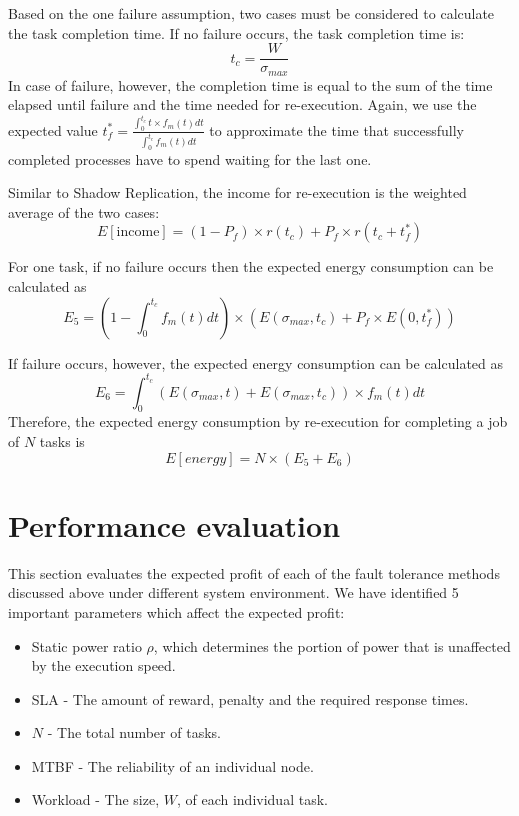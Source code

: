 Based on the one failure assumption, two cases must be considered to
calculate the task completion time. If no failure occurs, the task
completion time is:
\begin{equation}
t_c=\frac{W}{\sigma_{max}}
\end{equation}
In case of failure, however, the completion time is equal to the sum
of the time elapsed until failure and the time needed for
re-execution. Again, we use the expected value
$t_f^*=\frac{\int_0^{t_c}t \times f_m(t)dt}{\int_0^{t_c}f_m(t)dt}$ to
approximate the time that successfully completed processes have to
spend waiting for the last one.

Similar to Shadow Replication, the income for re-execution is the
weighted average of the two cases:
\begin{equation}
E[\text{income}]=(1-P_f) \times r(t_c) + P_f \times r(t_c+t_f^{*})
\end{equation}

For one task, if no failure occurs then the expected energy consumption can be
calculated as
\begin{equation}
E_5=(1 - \int_0^{t_c} f_m(t)dt) \times (E(\sigma_{max},t_c)+ P_f \times E(0,t_f^{*}))
\label{eq:energy_first_task}
\end{equation}

If failure occurs, however, the expected energy consumption can be calculated
as
\begin{equation}
E_6=\int_0^{t_c}(E(\sigma_{max},t) + E(\sigma_{max},t_c)) \times f_m(t) dt
\label{eq:energy_rexecution_task}
\end{equation}
Therefore, the expected energy consumption by re-execution for
completing a job of $N$ tasks is
\begin{equation}
E[energy]=N \times (E_5 + E_6)
\end{equation}

\section{Performance evaluation}

This section evaluates the expected profit of each of the fault tolerance
methods discussed above under different system environment. We have identified 5
important parameters which affect the expected profit:
\begin{itemize}
\item Static power ratio $\rho$, which determines the portion of power that is unaffected by the execution speed.
\item SLA - The amount of reward, penalty and the required response times.
\item $N$ - The total number of tasks.
\item MTBF - The reliability of an individual node.
\item Workload - The size, $W$, of each individual task.
\end{itemize}


